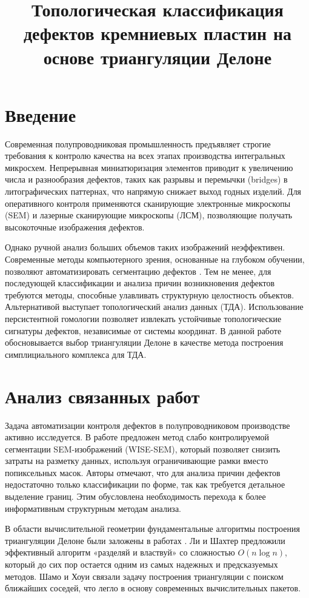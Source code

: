 \documentclass{misisarticle}
\title{Топологическая классификация дефектов кремниевых пластин на основе триангуляции Делоне}
\begin{document}
\maketitle

\section{Введение}

Современная полупроводниковая промышленность предъявляет строгие требования к контролю качества на всех этапах производства 
интегральных микросхем. Непрерывная миниатюризация элементов приводит к увеличению числа и разнообразия дефектов, таких как 
разрывы и перемычки (bridges) в литографических паттернах, что напрямую снижает выход годных изделий. Для оперативного контроля 
применяются сканирующие электронные микроскопы (SEM) и лазерные сканирующие микроскопы (ЛСМ), позволяющие получать высокоточные изображения дефектов.

Однако ручной анализ больших объемов таких изображений неэффективен. Современные методы компьютерного зрения, основанные на глубоком 
обучении, позволяют автоматизировать сегментацию дефектов \cite{lee2024}. Тем не менее, для последующей классификации и анализа причин 
возникновения дефектов требуются методы, способные улавливать структурную целостность объектов. Альтернативой выступает топологический 
анализ данных (ТДА). Использование персистентной гомологии позволяет извлекать устойчивые топологические сигнатуры дефектов, независимые 
от системы координат. В данной работе обосновывается выбор триангуляции Делоне в качестве метода построения симплициального комплекса для ТДА.
\section{Анализ связанных работ}
Задача автоматизации контроля дефектов в полупроводниковом производстве активно исследуется. В работе \cite{lee2024} предложен метод слабо 
контролируемой сегментации SEM-изображений (WISE-SEM), который позволяет снизить затраты на разметку данных, используя ограничивающие рамки 
вместо попиксельных масок. Авторы отмечают, что для анализа причин дефектов недостаточно только классификации по форме, так как требуется детальное 
выделение границ. Этим обусловлена необходимость перехода к более информативным структурным методам анализа.

В области вычислительной геометрии фундаментальные алгоритмы построения триангуляции Делоне были заложены в работах 
\cite{lee1980, shamos1975}. Ли и Шахтер \cite{lee1980} предложили эффективный алгоритм «разделяй и властвуй» со сложностью \(O(n \log n)\), 
который до сих пор остается одним из самых надежных и предсказуемых методов. Шамо и Хоуи \cite{shamos1975} связали задачу построения 
триангуляции с поиском ближайших соседей, что легло в основу современных вычислительных пакетов.
\end{document}
